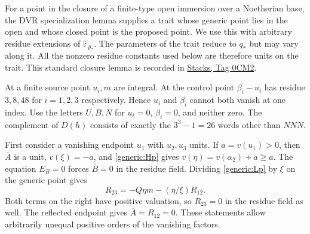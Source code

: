 \documentclass[11pt,a4paper]{article}
\theoremstyle{remark}\newtheorem{remark}[theorem]{Remark}
\newcommand{\Ab}{\overline A}\newcommand{\Bb}{\overline B}
\begin{document}
For a point in the closure of a finite-type open immersion over a
Noetherian base, the DVR specialization lemma supplies a trait whose
generic point lies in the open and whose closed point is the proposed
point. We use this with arbitrary residue extensions of
$\mathbb F_{p_*}$. The parameters of the trait reduce to $q_*$ but may
vary along it. All the nonzero residue constants used below are therefore
units on the trait. This standard closure lemma is recorded in
\href{https://stacks.math.columbia.edu/tag/0CM2}{Stacks, Tag 0CM2}.

At a finite source point $u_i,m$ are integral. At the control point
$\beta_i-u_i$ has residue $3,8,48$ for $i=1,2,3$ respectively. Hence
$u_i$ and $\beta_i$ cannot both vanish at one index. Use the letters
$U,B,N$ for $u_i=0$, $\beta_i=0$, and neither zero. The complement of
$D(h)$ consists of exactly the $3^3-1=26$ words other than $NNN$.

First consider a vanishing endpoint $u_1$ with $u_2,u_3$ units. If
$a=v(u_1)>0$, then $\Ab$ is a unit, $v(\xi)=-a$, and
\eqref{generic:Hp} gives
$v(\eta)=v(\alpha_2)+a\ge a$. The equation $E_B=0$ forces
$\Bb=0$ in the residue field. Dividing \eqref{generic:Lp} by $\xi$
on the generic point gives
\[
 R_{23}=-Q\eta m-(\eta/\xi)R_{12}.
\]
Both terms on the right have positive valuation, so $R_{23}=0$ in the
residue field as well. The reflected endpoint gives
$\Ab=R_{12}=0$. These statements allow arbitrarily unequal positive
orders of the vanishing factors.
\end{document}
